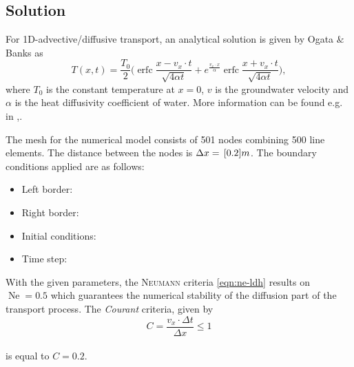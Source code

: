 \subsection{Solution}

For 1D-advective/diffusive transport, an analytical solution is given by {Ogata $\&$ Banks} \cite{aO61} as
\begin{equation}
T(x,t)=\frac{T_0}{2}\bigg( \operatorname{erfc} \frac{x-v_x\cdot t}{\sqrt{4\alpha t}} + e^{\frac{v_x\cdot x}{\alpha}} \operatorname{erfc}\frac{x+v_x\cdot t}{\sqrt{4\alpha t}}\bigg),
\label{eqn:addiff1}
\end{equation}
where $T_0$ is the constant temperature at $x=0$, $v$ is the groundwater velocity and $\alpha$ is the heat diffusivity coefficient of water. More information can be found e.g. in \cite{HaeSamVoi:92},\cite{Kol:97}.

The mesh for the numerical model consists of 501 nodes combining 500 line elements. The distance between the nodes is $\Delta x=\, \mathrm{[}0.2]{m}$. The boundary conditions applied are as follows:

\begin{itemize}
	\item Left border:
	\item Right border:	
	\item Initial conditions:
	\item Time step:
\end{itemize}
With the given parameters, the \textsc{Neumann} criteria \eqref{eqn:ne-ldh} results on $\operatorname{Ne}=0.5$ which guarantees the numerical stability of the diffusion part of the transport process. The \textit{Courant} criteria, given by
\begin{equation}
	C=\frac{v_x\cdot\Delta t}{\Delta x}\leq1
	\label{eqn:addiff2}
\end{equation}\\
is equal to $C=0.2$.

